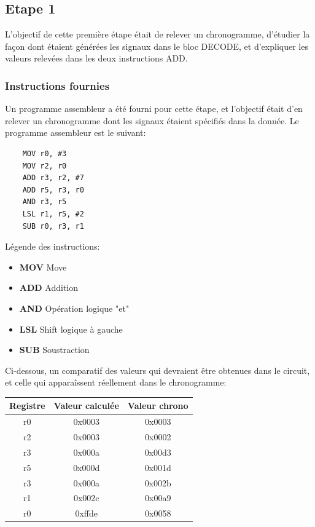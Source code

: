 \documentclass[a4paper]{article} %
\begin{document}
\subsection{Etape 1}
L'objectif de cette première étape était de relever un chronogramme, d'étudier la façon dont étaient générées les signaux dans le bloc DECODE, et d'expliquer les valeurs relevées dans les deux instructions ADD.
\subsubsection{Instructions fournies}
Un programme assembleur a été fourni pour cette étape, et l'objectif était d'en relever un chronogramme dont les signaux étaient spécifiés dans la donnée.
Le programme assembleur est le suivant:\medskip \\ 
\begin{center}
    \begin{lstlisting}
    MOV r0, #3
    MOV r2, r0
    ADD r3, r2, #7
    ADD r5, r3, r0
    AND r3, r5
    LSL r1, r5, #2
    SUB r0, r3, r1
    \end{lstlisting}
\end{center}


Légende des instructions:
\begin{itemize}
    \item \textbf{MOV} Move
    \item \textbf{ADD} Addition
    \item \textbf{AND} Opération logique "et"
    \item \textbf{LSL} Shift logique à gauche
    \item \textbf{SUB} Soustraction    
\end{itemize}
\medskip
Ci-dessous, un comparatif des valeurs qui devraient être obtenues dans le circuit, et celle qui apparaîssent réellement dans le chronogramme:
\medskip
\\
\begin{center}
    \begin{tabular}{|c|c|c|}
        \hline
            Registre & Valeur calculée & Valeur chrono\\
            \hline
            r0   & 0x0003 & 0x0003 \\
            \hline
            r2   & 0x0003 & 0x0002\\
            \hline
            r3   & 0x000a & 0x00d3\\
            \hline
            r5   & 0x000d & 0x001d \\
            \hline
            r3   & 0x000a & 0x002b \\
            \hline
            r1   & 0x002c & 0x00a9 \\
            \hline
            r0   & 0xffde & 0x0058 \\
            \hline
    \end{tabular}
\end{center}
\end{document}
